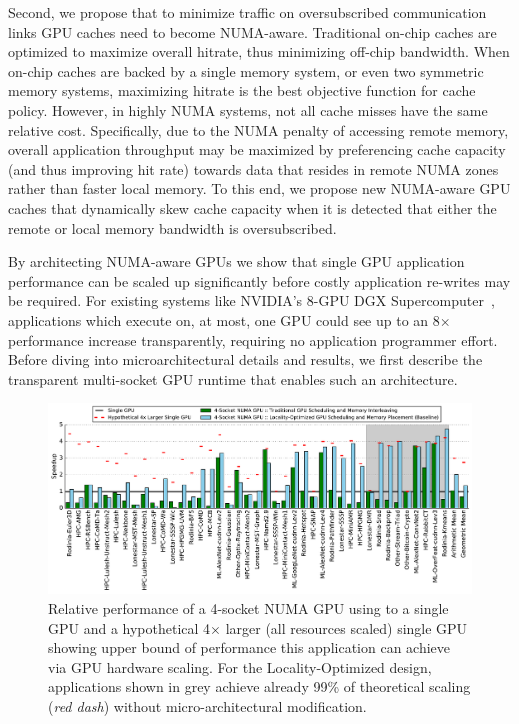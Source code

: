 Second, we propose that to minimize traffic on oversubscribed communication 
links GPU caches need to become NUMA-aware.  Traditional on-chip caches are 
optimized to maximize overall hitrate, thus minimizing off-chip bandwidth.  When 
on-chip caches are backed by a single memory system, or even two symmetric 
memory systems, maximizing hitrate is the best objective function for cache 
policy.  However, in highly NUMA systems,  not all cache misses have the same 
relative cost.  Specifically, due to the NUMA penalty of accessing remote 
memory, overall application throughput may be maximized by preferencing cache 
capacity (and thus improving hit rate) towards data that resides in remote NUMA 
zones rather than faster local memory. To this end, we propose new NUMA-aware 
GPU caches that dynamically skew cache capacity when it is detected that either 
the remote or local memory bandwidth is oversubscribed.

By architecting NUMA-aware GPUs we show that single GPU application performance 
can be scaled up significantly before costly application re-writes may be 
required. For existing systems like NVIDIA's 8-GPU DGX 
Supercomputer~\cite{dgx}, applications which execute on, at most, one GPU could 
see up to an 8$\times$ performance increase transparently, requiring no 
application programmer effort. Before diving into microarchitectural details and 
results, we first describe the transparent multi-socket GPU runtime that enables 
such an architecture.

\begin{figure}[tp] 
    \centering
    \includegraphics[width=1.0\linewidth]{figures/plot_different_baselines.pdf}
    \caption{Relative performance of a 4-socket NUMA GPU using to a single GPU 
and a hypothetical 4$\times$ larger (all resources scaled) single GPU showing 
upper bound of performance this application can achieve via GPU hardware 
scaling. For the Locality-Optimized design, applications shown in grey 
achieve already 99\% of theoretical scaling (\emph{red dash}) without 
micro-architectural modification.}
    \label{fig:motivation}
    \vspace{-.2in}
\end{figure}
